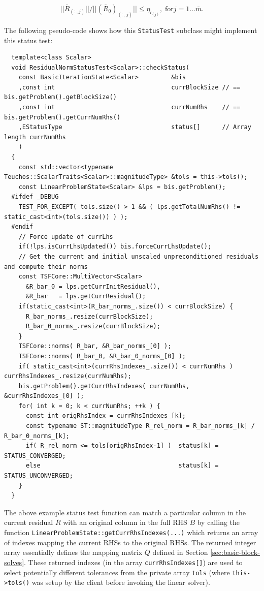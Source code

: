\documentclass[pdf,ps2pdf,11pt]{SANDreport}
\begin{document}
\begin{enumerate}
\[
||\bar{R}_{(:,j)}|| / ||(\bar{R}_0)_{(:,j)}|| \leq \eta_{l_{(j)}}, \;
\mbox{for} j = 1 \ldots \bar{m}.
\]

The following pseudo-code shows how this {}\texttt{Status\-Test}
subclass might implement this status test:

{\scriptsize\begin{verbatim}
  template<class Scalar>
  void ResidualNormStatusTest<Scalar>::checkStatus(
    const BasicIterationState<Scalar>         &bis
    ,const int                                currBlockSize // == bis.getProblem().getBlockSize()
    ,const int                                currNumRhs    // == bis.getProblem().getCurrNumRhs()
    ,EStatusType                              status[]      // Array length currNumRhs
    )
  {
    const std::vector<typename Teuchos::ScalarTraits<Scalar>::magnitudeType> &tols = this->tols();
    const LinearProblemState<Scalar> &lps = bis.getProblem();
  #ifdef _DEBUG
    TEST_FOR_EXCEPT( tols.size() > 1 && ( lps.getTotalNumRhs() != static_cast<int>(tols.size()) ) );
  #endif
    // Force update of currLhs
    if(!lps.isCurrLhsUpdated()) bis.forceCurrLhsUpdate();  
    // Get the current and initial unscaled unpreconditioned residuals and compute their norms
    const TSFCore::MultiVector<Scalar>
      &R_bar_0 = lps.getCurrInitResidual(),
      &R_bar   = lps.getCurrResidual();
    if(static_cast<int>(R_bar_norms_.size()) < currBlockSize) {
      R_bar_norms_.resize(currBlockSize);
      R_bar_0_norms_.resize(currBlockSize);
    }
    TSFCore::norms( R_bar, &R_bar_norms_[0] );
    TSFCore::norms( R_bar_0, &R_bar_0_norms_[0] );
    if( static_cast<int>(currRhsIndexes_.size()) < currNumRhs ) currRhsIndexes_.resize(currNumRhs);
    bis.getProblem().getCurrRhsIndexes( currNumRhs, &currRhsIndexes_[0] );
    for( int k = 0; k < currNumRhs; ++k ) {
      const int origRhsIndex = currRhsIndexes_[k];
      const typename ST::magnitudeType R_rel_norm = R_bar_norms_[k] / R_bar_0_norms_[k];
      if( R_rel_norm <= tols[origRhsIndex-1] )  status[k] = STATUS_CONVERGED;
      else                                      status[k] = STATUS_UNCONVERGED;
    }
  }
\end{verbatim}}

The above example status test function can match a particular column
in the current residual $\bar{R}$ with an original column in the full
RHS $B$ by calling the function
{}\texttt{Linear\-Problem\-State::\-get\-Curr\-Rhs\-Indexes(...)}
which returns an array of indexes mapping the current RHSs to the
original RHSs.  The returned integer array essentially defines the
mapping matrix $\bar{Q}$ defined in Section
{}\ref{sec:basic-block-solves}.  These returned indexes (in the array
{}\texttt{currRhsIndexes[]}) are used to select potentially different
tolerances from the private array {}\texttt{tols} (where
{}\texttt{this->tols()} was setup by the client before invoking the
linear solver).


\end{enumerate}
\end{document}

